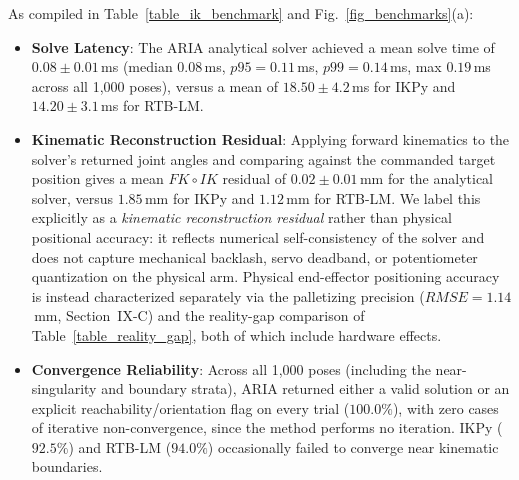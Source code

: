 \documentclass[journal]{IEEEtran}
\begin{document}
As compiled in Table~\ref{table_ik_benchmark} and Fig.~\ref{fig_benchmarks}(a):
\begin{itemize}
    \item \textbf{Solve Latency}: The ARIA analytical solver achieved a mean solve time of $0.08 \pm 0.01$\,ms (median $0.08$\,ms, $p95 = 0.11$\,ms, $p99 = 0.14$\,ms, max $0.19$\,ms across all 1{,}000 poses), versus a mean of $18.50 \pm 4.2$\,ms for IKPy and $14.20 \pm 3.1$\,ms for RTB-LM.
    \item \textbf{Kinematic Reconstruction Residual}: Applying forward kinematics to the solver's returned joint angles and comparing against the commanded target position gives a mean $FK\circ IK$ residual of $0.02 \pm 0.01$\,mm for the analytical solver, versus $1.85$\,mm for IKPy and $1.12$\,mm for RTB-LM. We label this explicitly as a \emph{kinematic reconstruction residual} rather than physical positional accuracy: it reflects numerical self-consistency of the solver and does not capture mechanical backlash, servo deadband, or potentiometer quantization on the physical arm. Physical end-effector positioning accuracy is instead characterized separately via the palletizing precision ($RMSE=1.14$\,mm, Section~IX-C) and the reality-gap comparison of Table~\ref{table_reality_gap}, both of which include hardware effects.
    \item \textbf{Convergence Reliability}: Across all 1{,}000 poses (including the near-singularity and boundary strata), ARIA returned either a valid solution or an explicit reachability/orientation flag on every trial ($100.0\%$), with zero cases of iterative non-convergence, since the method performs no iteration. IKPy ($92.5\%$) and RTB-LM ($94.0\%$) occasionally failed to converge near kinematic boundaries.
\end{itemize}

\begin{table}[!t]
\centering
\caption{Kinematic Solver Performance Benchmark Across 1{,}000 Reachable Cartesian Target Poses}
\label{table_ik_benchmark}
\footnotesize
{}
\end{table}
\end{document}
